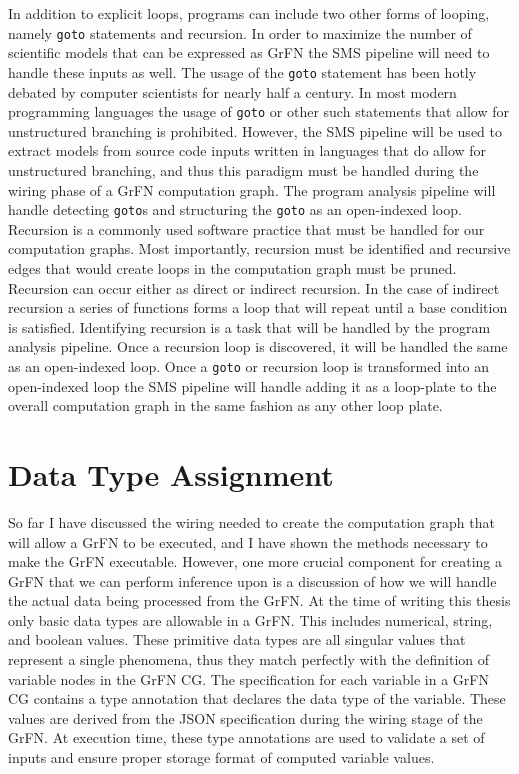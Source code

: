 In addition to explicit loops, programs can include two other forms of looping, namely \texttt{goto} statements and recursion.
In order to maximize the number of scientific models that can be expressed as GrFN the SMS pipeline will need to handle these inputs as well.
The usage of the \texttt{goto} statement has been hotly debated by computer scientists for nearly half a century.
In most modern programming languages the usage of \texttt{goto} or other such statements that allow for unstructured branching is prohibited.
However, the SMS pipeline will be used to extract models from source code inputs written in languages that do allow for unstructured branching, and thus this paradigm must be handled during the wiring phase of a GrFN computation graph.
The program analysis pipeline will handle detecting \texttt{goto}s and structuring the \texttt{goto} as an open-indexed loop.
Recursion is a commonly used software practice that must be handled for our computation graphs.
Most importantly, recursion must be identified and recursive edges that would create loops in the computation graph must be pruned.
Recursion can occur either as direct or indirect recursion.
In the case of indirect recursion a series of functions forms a loop that will repeat until a base condition is satisfied.
Identifying recursion is a task that will be handled by the program analysis pipeline.
Once a recursion loop is discovered, it will be handled the same as an open-indexed loop.
Once a \texttt{goto} or recursion loop is transformed into an open-indexed loop the SMS pipeline will handle adding it as a loop-plate to the overall computation graph in the same fashion as any other loop plate.


\section{Data Type Assignment\label{sec:data_types}}
So far I have discussed the wiring needed to create the computation graph that will allow a GrFN to be executed, and I have shown the methods necessary to make the GrFN executable. However, one more crucial component for creating a GrFN that we can perform inference upon is a discussion of how we will handle the actual data being processed from the GrFN. At the time of writing this thesis only basic data types are allowable in a GrFN. This includes numerical, string, and boolean values. These primitive data types are all singular values that represent a single phenomena, thus they match perfectly with the definition of variable nodes in the GrFN CG. The specification for each variable in a GrFN CG contains a type annotation that declares the data type of the variable. These values are derived from the JSON specification during the wiring stage of the GrFN. At execution time, these type annotations are used to validate a set of inputs and ensure proper storage format of computed variable values.

